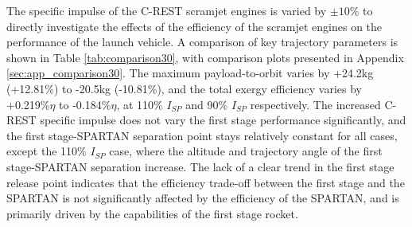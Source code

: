 The specific impulse of the C-REST scramjet engines is varied by $\pm10\%$ to directly investigate the effects of the efficiency of the scramjet engines on the performance of the launch vehicle. A comparison of key trajectory parameters is shown in Table \ref{tab:comparison30}, with comparison plots presented in Appendix \ref{sec:app_comparison30}. The maximum payload-to-orbit varies by +24.2kg (+12.81\%) to -20.5kg (-10.81\%), and the total exergy efficiency varies by +0.219\%$\eta$ to -0.184\%$\eta$, at 110\% $I_{SP}$ and 90\% $I_{SP}$ respectively. 
The increased C-REST specific impulse does not vary the first stage performance significantly, and the first stage-SPARTAN separation point stays relatively constant for all cases, except the 110\% $I_{SP}$ case, where the altitude and trajectory angle of the first stage-SPARTAN separation increase.   
The lack of a clear trend in the first stage release point indicates that the efficiency trade-off between the first stage and the SPARTAN is not significantly affected by the efficiency of the SPARTAN, and is primarily driven by the capabilities of the first stage rocket. 

